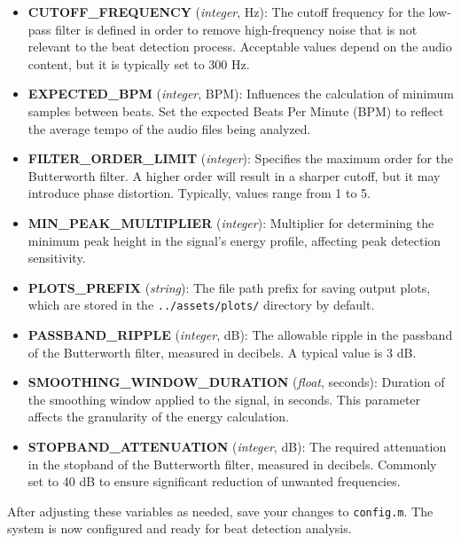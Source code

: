\begin{itemize}
    \item \textbf{CUTOFF\_FREQUENCY} (\textit{integer}, Hz): The cutoff frequency for the low-pass filter is defined in order to remove high-frequency noise that is not relevant to the beat detection process. Acceptable values depend on the audio content, but it is typically set to 300 Hz.
    
    \item \textbf{EXPECTED\_BPM} (\textit{integer}, BPM): Influences the calculation of minimum samples between beats.  Set the expected Beats Per Minute (BPM) to reflect the average tempo of the audio files being analyzed.
    
    \item \textbf{FILTER\_ORDER\_LIMIT} (\textit{integer}): Specifies the maximum order for the Butterworth filter.  A higher order will result in a sharper cutoff, but it may introduce phase distortion. Typically, values range from 1 to 5.
    
    \item \textbf{MIN\_PEAK\_MULTIPLIER} (\textit{integer}): Multiplier for determining the minimum peak height in the signal's energy profile, affecting peak detection sensitivity.
    
    \item \textbf{PLOTS\_PREFIX} (\textit{string}): The file path prefix for saving output plots, which are stored in the \texttt{../assets/plots/} directory by default.
    
    \item \textbf{PASSBAND\_RIPPLE} (\textit{integer}, dB): The allowable ripple in the passband of the Butterworth filter, measured in decibels. A typical value is 3 dB.
    
    \item \textbf{SMOOTHING\_WINDOW\_DURATION} (\textit{float}, seconds): Duration of the smoothing window applied to the signal, in seconds. This parameter affects the granularity of the energy calculation.
    
    \item \textbf{STOPBAND\_ATTENUATION} (\textit{integer}, dB): The required attenuation in the stopband of the Butterworth filter, measured in decibels. Commonly set to 40 dB to ensure significant reduction of unwanted frequencies.
\end{itemize}

After adjusting these variables as needed, save your changes to \texttt{config.m}. The system is now configured and ready for beat detection analysis.

